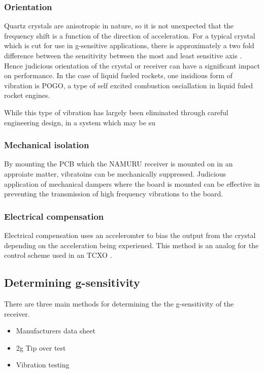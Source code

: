 \subsubsection{Orientation}
Quartz crystals are anisotropic in nature, so it is not unexpected that the frequency shift is a function of the direction of acceleration. For a typical crystal which is cut for use in g-sensitive applications, there is approximately a two fold difference between the sensitivity between the most and least sensitive axis \cite{CrystalVibration}. Hence judicious orientation of the crystal or receiver can have a significant impact on performance. In the case of liquid fueled rockets, one insidious form of vibration is POGO, a type of self excited combustion osciallation in liquid fuled rocket engines\cite{Pogo}. 

While this type of vibration has largely been eliminated through careful engineering design, in a system which may be su


\subsubsection{Mechanical isolation}
By mounting the PCB which the \ac{NAMURU} receiver is mounted on in an approiate matter, vibratoins can be mechanically suppressed. Judicious application of mechanical dampers where the board is mounted can be effective in preventing the transmission of high frequency vibrations to the board. 

\subsubsection{Electrical compensation}
Electrical compensation uses an acceleromter to bias the output from the crystal depending on the acceleration being experiened. This method is an analog for the control scheme used in an \ac{TCXO} \cite{CrystalVibration}. 


\subsection{Determining g-sensitivity}
There are three main methods for determining the the g-sensitivity of the receiver.

\begin{itemize}
\item{Manufacturers data sheet}
\item{2g Tip over test}
\item{Vibration testing}
\end{itemize}

